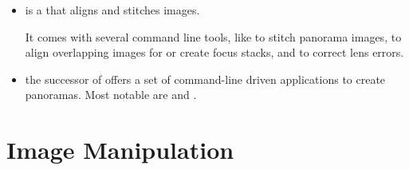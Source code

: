\begin{itemize}
\item\label{app:hugin}
   is
  a  that aligns and stitches images.

  It comes with several command line tools, like
   to stitch panorama
  images,  to align overlapping images for  or
  create focus stacks, and  to correct lens errors.

\item\label{app:panotools} 
  the successor of 
   offers a set of
  command-line driven applications to create panoramas.  Most notable
  are  and
  .
\end{itemize}


\section[Image Manipulation]{Image Manipulation
  \label{sec:image-manipulation}
  }

